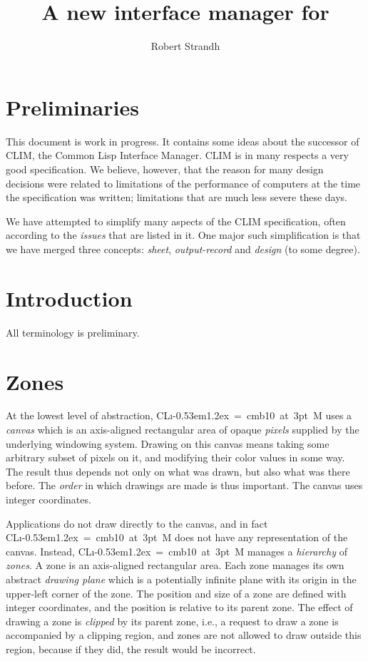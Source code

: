 \documentclass{report}
\title{\clim{}\\ A new interface manager for\\ \cl{}}
\author{Robert Strandh}
\def\Tiny{ \font\Tinyfont = cmb10 at 3pt \relax  \Tinyfont}
\def\clim{\textsf{CL{\i}\kern-0.53em\raise1.2ex\hbox{\Tiny 3}M}}
\def\climtwo{CLIM\thinspace{\small II}}
\begin{document}
\maketitle

\tableofcontents

\chapter{Preliminaries}

This document is work in progress.  It contains some ideas about the
successor of \climtwo{}, the Common Lisp Interface Manager.  \climtwo{} is in
many respects a very good specification.  We believe, however, that
the reason for many design decisions were related to limitations of
the performance of computers at the time the specification was
written; limitations that are much less severe these days.  

We have attempted to simplify many aspects of the \climtwo{}
specification, often according to the \emph{issues} that are listed in
it.  One major such simplification is that we have merged three
concepts: \emph{sheet}, \emph{output-record} and \emph{design} (to
some degree). 

\chapter{Introduction}

All terminology is preliminary.


\chapter{Zones}

At the lowest level of abstraction, \clim{} uses a \emph{canvas} which
is an axis-aligned rectangular area of opaque \emph{pixels} supplied by
the underlying windowing system.  Drawing on this canvas means taking
some arbitrary subset of pixels on it, and modifying their color
values in some way.  The result thus depends not only on what was
drawn, but also what was there before.  The \emph{order} in which
drawings are made is thus important.  The canvas uses integer
coordinates.

Applications do not draw directly to the canvas, and in fact \clim{}
does not have any representation of the canvas.  Instead,
\clim{} manages a \emph{hierarchy} of \emph{zones}.  A zone is an
axis-aligned rectangular area.  Each zone manages its own abstract
\emph{drawing plane} which is a potentially infinite plane with its
origin in the upper-left corner of the zone.  The position and size
of a zone are defined with integer coordinates, and the position is
relative to its parent zone.  The effect of drawing a zone is
\emph{clipped} by its parent zone, i.e., a request to draw a zone
is accompanied by a clipping region, and zones are not allowed to
draw outside this region, because if they did, the result would be
incorrect. 
\end{document}
